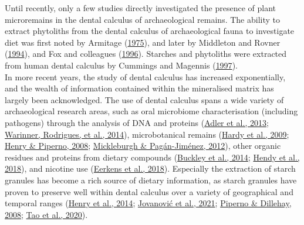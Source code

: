 \documentclass[
  letterpaper,
]{book}
\begin{document}
Until recently, only a few studies directly investigated the presence of
plant microremains in the dental calculus of archaeological remains. The
ability to extract phytoliths from the dental calculus of archaeological
fauna to investigate diet was first noted by Armitage
(\protect\hyperlink{ref-armitageExtractionIdentification1975}{1975}),
and later by Middleton and Rovner
(\protect\hyperlink{ref-middletonOpalPhytoliths1994}{1994}), and Fox and
colleagues (\protect\hyperlink{ref-foxPhytolithCalculus1996}{1996}).
Starches and phytoliths were extracted from human dental calculus by
Cummings and Magennis
(\protect\hyperlink{ref-cummingsMayanCalculus1997}{1997}).\\
In more recent years, the study of dental calculus has increased
exponentially, and the wealth of information contained within the
mineralised matrix has largely been acknowledged. The use of dental
calculus spans a wide variety of archaeological research areas, such as
oral microbiome characterisation (including pathogens) through the
analysis of DNA and proteins
(\protect\hyperlink{ref-adlerSequencingAncient2013}{Adler et al., 2013};
\protect\hyperlink{ref-warinnerPathogensHost2014}{Warinner, Rodrigues,
et al., 2014}), microbotanical remains
(\protect\hyperlink{ref-hardyStarchGranules2009}{Hardy et al., 2009};
\protect\hyperlink{ref-henryCalculusSyria2008}{Henry \& Piperno, 2008};
\protect\hyperlink{ref-mickleburghNewInsights2012}{Mickleburgh \&
Pagán-Jiménez, 2012}), other organic residues and proteins from dietary
compounds (\protect\hyperlink{ref-buckleyDentalCalculus2014}{Buckley et
al., 2014}; \protect\hyperlink{ref-hendyProteomicCalculus2018}{Hendy et
al., 2018}), and nicotine use
(\protect\hyperlink{ref-eerkensDentalCalculus2018}{Eerkens et al.,
2018}). Especially the extraction of starch granules has become a rich
source of dietary information, as starch granules have proven to
preserve well within dental calculus over a variety of geographical and
temporal ranges
(\protect\hyperlink{ref-henryNeanderthalCalculus2014}{Henry et al.,
2014}; \protect\hyperlink{ref-jovanovicNeolithicCalculus2021}{Jovanović
et al., 2021}; \protect\hyperlink{ref-pipernoStarchGrains2008}{Piperno
\& Dillehay, 2008}; \protect\hyperlink{ref-taoWheatCalculus2020}{Tao et
al., 2020}).
\end{document}
